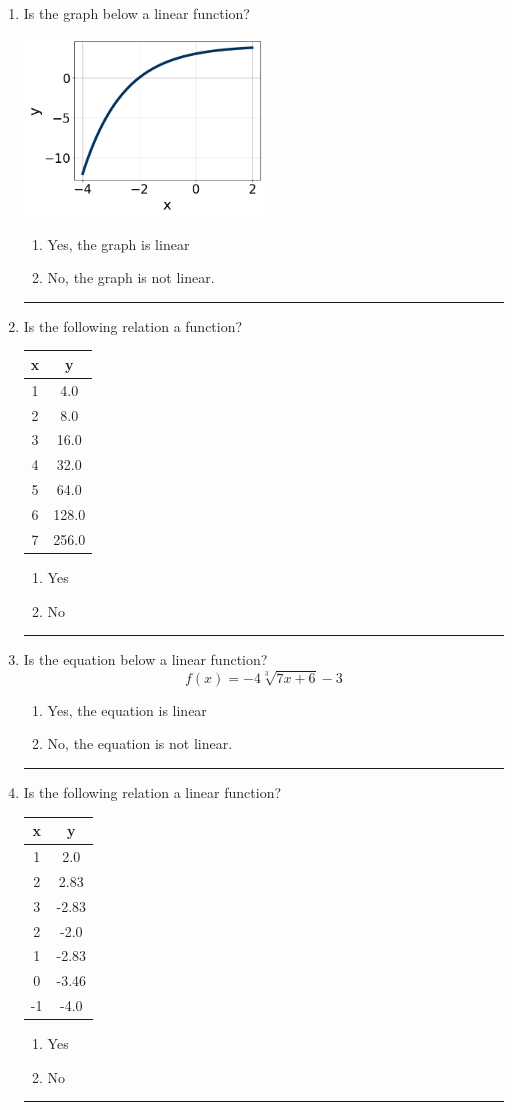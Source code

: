 \documentclass[14pt]{extbook}
\newcommand{\litem}[1]{\item#1\hspace*{-1cm}\rule{\textwidth}{0.4pt}}
\begin{document}
\begin{enumerate}
\litem{
Is the graph below a linear function?
\begin{center}
    \includegraphics[width=0.5\textwidth]{../Figures/MA_8_F_1_2_graphT.png}
\end{center}
\begin{enumerate}[label=\Alph*.]
\item Yes, the graph is linear
\item No, the graph is not linear.

\end{enumerate} }
\litem{
Is the following relation a function?

\begin{tabular}{c|c}
x &y\tabularnewline \hline
1 &4.0\tabularnewline \hline
2 &8.0\tabularnewline \hline
3 &16.0\tabularnewline \hline
4 &32.0\tabularnewline \hline
5 &64.0\tabularnewline \hline
6 &128.0\tabularnewline \hline
7 &256.0\end{tabular}\begin{enumerate}[label=\Alph*.]
\item Yes
\item No

\end{enumerate} }
\litem{
Is the equation below a linear function?\[ f(x) = {-4}\sqrt[3]{7x + 6}-3 \]\begin{enumerate}[label=\Alph*.]
\item Yes, the equation is linear
\item No, the equation is not linear.

\end{enumerate} }
\litem{
Is the following relation a linear function?

\begin{tabular}{c|c}
x &y\tabularnewline \hline
1 &2.0\tabularnewline \hline
2 &2.83\tabularnewline \hline
3 &-2.83\tabularnewline \hline
2 &-2.0\tabularnewline \hline
1 &-2.83\tabularnewline \hline
0 &-3.46\tabularnewline \hline
-1 &-4.0\end{tabular}\begin{enumerate}[label=\Alph*.]
\item Yes
\item No

\end{enumerate} }
\end{enumerate}
\end{document}
